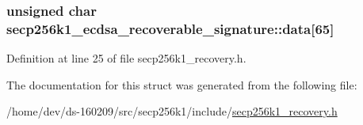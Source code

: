 \subsubsection[{data}]{\setlength{\rightskip}{0pt plus 5cm}unsigned char secp256k1\+\_\+ecdsa\+\_\+recoverable\+\_\+signature\+::data\mbox{[}65\mbox{]}}\label{structsecp256k1__ecdsa__recoverable__signature_a7157f0cd8b8fb97fceacfd9c0024a952}


Definition at line 25 of file secp256k1\+\_\+recovery.\+h.



The documentation for this struct was generated from the following file\+:\begin{DoxyCompactItemize}
\item 
/home/dev/ds-\/160209/src/secp256k1/include/\hyperlink{secp256k1__recovery_8h}{secp256k1\+\_\+recovery.\+h}\end{DoxyCompactItemize}
